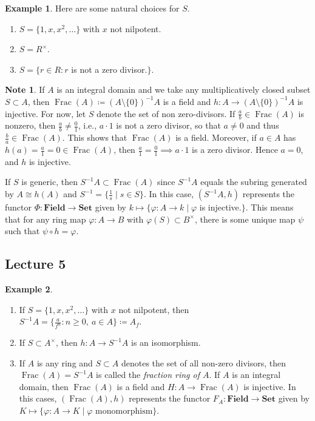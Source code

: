 \documentclass[10pt,letterpaper,cm]{nupset}
\theoremstyle{definition}
\newtheorem{exmp}{Example}
\newtheorem{note}{Note}
\newcommand{\1}{\mathbf{1}}
\newcommand{\0}{\vec 0}
\DeclareMathOperator{\Frac}{Frac}
\begin{document}
\begin{exmp}
Here are some natural choices for $S$.
\begin{enumerate}[label=(\alph*)]
\item $S = \{1, x, x^2, \ldots \}$ with $x$ not nilpotent.
\item $S = R^{\times}$.
\item $S = \{r\in R : r$ is not a zero divisor.$\}$.
\end{enumerate}
\end{exmp}

\begin{note}
If $A$ is an integral domain and we take any multiplicatively closed subset $S\subset A$, then $\Frac(A)\coloneqq  (A \setminus \{0\})^{-1}A$ is a field and $h : A \to (A \setminus \{0\})^{-1}A$ is injective. For now, let $S$ denote the set of non zero-divisors.  If $\frac{a}{b} \in \Frac(A)$ is nonzero, then $\frac{a}{b} \ne \frac{0}{1}$, i.e., $a\cdot 1$ is not a zero divisor, so that $a\ne 0$ and thus $\frac{b}{a} \in \Frac(A)$. This shows that $\Frac(A)$ is a field. Moreover, if $a\in A$ has $h(a) = \frac{a}{1} = 0\in \Frac(A)$, then $\frac{a}{1}= \frac{0}{1} \implies a\cdot 1$ is a zero divisor. Hence $a=0$, and $h$ is injective. 

If $S$ is generic, then $S^{-1}A \subset \Frac(A)$ since $S^{-1}A$ equals the subring generated by $A\cong h(A)$ and $S^{-1} = \{\frac{1}{s}\mid s\in S\}$. In this case, $(S^{-1}A, h)$ represents the functor $\Phi : \mathbf{Field} \to \mathbf{Set}$ given by $k \mapsto \{\varphi : A \to k \mid \varphi$ is injective.$\}$. This means that for any ring map $\varphi: A \to B$ with $\varphi(S) \subset B^{\times}$, there is some unique map $\psi$ such that $\psi \circ h = \varphi$.
\end{note}

\subsection{Lecture 5}

\begin{exmp} $ $
\begin{enumerate}
\item If  $S = \{1, x, x^2, \ldots \}$ with $x$ not nilpotent, then $S^{-1}A = \{\frac{a}{f^n} : n\geq 0, \ a \in A\}\coloneqq  A_f$.
\item If $S \subset A^{\times}$, then $h: A \to S^{-1}A$ is an isomorphism. 
\item If $A$ is any ring and $S\subset A$ denotes the set of all non-zero divisors, then $\Frac(A) = S^{-1}A$ is called the \textit{fraction ring of $A$}. If $A$ is an integral domain, then $\Frac(A)$ is a field and $H : A \to \Frac(A)$ is injective. In this cases, $(\Frac(A), h)$ represents the functor $F_A : \mathbf{Field} \to \mathbf{Set}$ given by $K \mapsto \{\varphi: A \to K \mid \varphi \text{ monomorphism}\}$. 
\end{enumerate}
\end{exmp}
\end{document}
